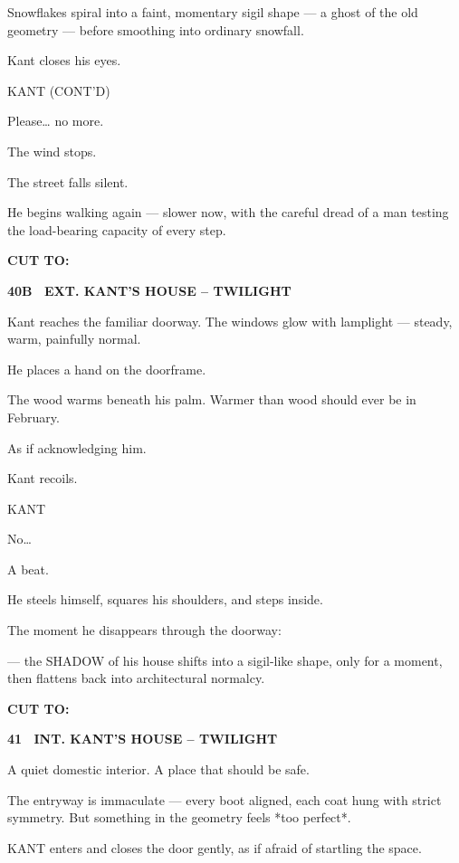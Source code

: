 \documentclass[12pt]{article}
\newcommand{\scene}[2]{%
  \vspace{1.8\baselineskip}%
  \noindent\textbf{#1 \ #2}\par\vspace{0.4\baselineskip}%
}
\newenvironment{dialogue}[1]{%
  \vspace{0.8\baselineskip}%
  \noindent\hspace*{2.3in}\textsc{#1}\par%
  \noindent\hspace*{1.5in}\begin{minipage}[t]{4.5in}%
}{%
  \end{minipage}\par%
}
\newcommand{\transition}[1]{%
  \vspace{0.6\baselineskip}%
  \begin{flushright}\textbf{#1}\end{flushright}%
}
\begin{document}
Snowflakes spiral into a faint, momentary sigil shape —  
a ghost of the old geometry —  
before smoothing into ordinary snowfall.

Kant closes his eyes.

\begin{dialogue}{KANT (CONT'D)}
Please…  
no more.
\end{dialogue}

The wind stops.

The street falls silent.

He begins walking again —  
slower now, with the careful dread of a man testing the load-bearing 
capacity of every step.

\transition{CUT TO:}


\scene{40B}{EXT. KANT'S HOUSE -- TWILIGHT}

Kant reaches the familiar doorway.  
The windows glow with lamplight — steady, warm, painfully normal.

He places a hand on the doorframe.

The wood warms beneath his palm.  
Warmer than wood should ever be in February.

As if acknowledging him.

Kant recoils.

\begin{dialogue}{KANT}
No…
\end{dialogue}

A beat.

He steels himself, squares his shoulders, and steps inside.

The moment he disappears through the doorway:

— the SHADOW of his house shifts into a sigil-like shape,  
only for a moment,  
then flattens back into architectural normalcy.

\transition{CUT TO:}


\scene{41}{INT. KANT'S HOUSE -- TWILIGHT}

A quiet domestic interior.
A place that should be safe.

The entryway is immaculate — every boot aligned, each coat hung with
strict symmetry. But something in the geometry feels *too perfect*.

KANT enters and closes the door gently, as if afraid of startling the
space.
\end{document}
